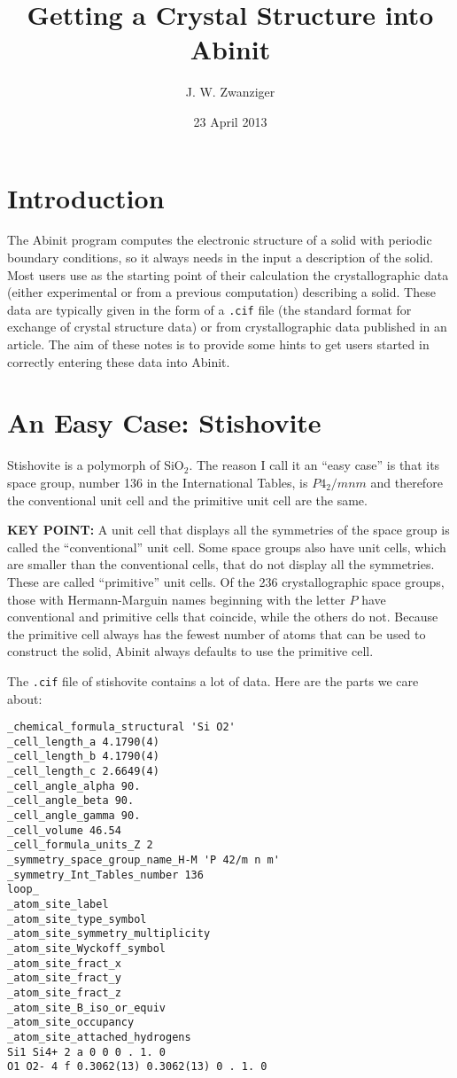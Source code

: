 \documentclass{article}
\author{J. W. Zwanziger}
\date{23 April 2013}
\title{Getting a Crystal Structure into {\sc Abinit}}
\begin{document}
\maketitle

\section{Introduction}

The {\sc Abinit} program computes the electronic structure of a solid with
periodic boundary conditions, so it always needs in the input a description of
the solid. Most users  use as the starting point of their calculation the crystallographic
data (either experimental or from a previous computation) describing a solid. These
data are typically given in the form of a {\tt .cif} file (the standard format for
exchange of crystal structure data) or from crystallographic data published in an
article. The aim of these notes is to provide some hints to get users started in
correctly entering these data into {\sc Abinit}.

\section{An Easy Case: Stishovite}

Stishovite is a polymorph of SiO$_2$. The reason I call it an ``easy case'' is that its space
group, number 136 in the International Tables, is $P4_2/mnm$ and therefore the conventional
unit cell and the primitive unit cell are the same.

{\bf KEY POINT:} A unit cell that displays all the symmetries of the space group is called the
``conventional'' unit cell. Some space groups also have unit cells, which are smaller than
the conventional cells, that do not display all the symmetries. These are called ``primitive''
unit cells. Of the 236 crystallographic space groups, those with Hermann-Marguin names beginning
with the letter $P$ have conventional and primitive cells that coincide, while the others do not.
Because the primitive cell always has the fewest number of atoms that can be used to construct
the solid, {\sc Abinit} always defaults to use the primitive cell.

The {\tt .cif} file of stishovite contains a lot of data. Here are the parts we care about:
\begin{verbatim}
_chemical_formula_structural 'Si O2'
_cell_length_a 4.1790(4)
_cell_length_b 4.1790(4)
_cell_length_c 2.6649(4)
_cell_angle_alpha 90.
_cell_angle_beta 90.
_cell_angle_gamma 90.
_cell_volume 46.54
_cell_formula_units_Z 2
_symmetry_space_group_name_H-M 'P 42/m n m'
_symmetry_Int_Tables_number 136
loop_
_atom_site_label
_atom_site_type_symbol
_atom_site_symmetry_multiplicity
_atom_site_Wyckoff_symbol
_atom_site_fract_x
_atom_site_fract_y
_atom_site_fract_z
_atom_site_B_iso_or_equiv
_atom_site_occupancy
_atom_site_attached_hydrogens
Si1 Si4+ 2 a 0 0 0 . 1. 0
O1 O2- 4 f 0.3062(13) 0.3062(13) 0 . 1. 0
\end{verbatim}
\end{document}
